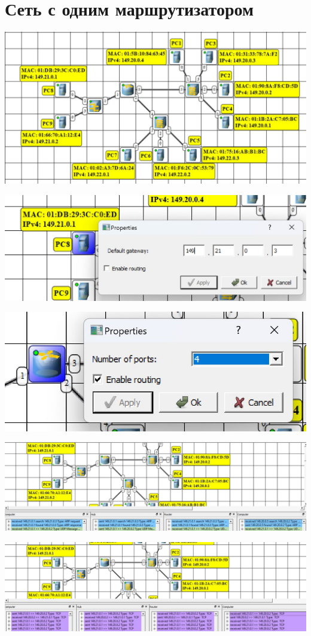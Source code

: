 \documentclass{article}
\begin{document}
\section*{Сеть с одним маршрутизатором}
\begin{center}
    \includegraphics[width=.9\textwidth]{1-1}
\end{center}
\begin{center}
    \includegraphics[width=.9\textwidth]{1-2}
\end{center}
\begin{center}
    \includegraphics[width=.9\textwidth]{1-3}
\end{center}
\begin{center}
    \includegraphics[width=.9\textwidth]{1-4}
\end{center}
\begin{center}
    \includegraphics[width=.9\textwidth]{1-5}
\end{center}
\end{document}
